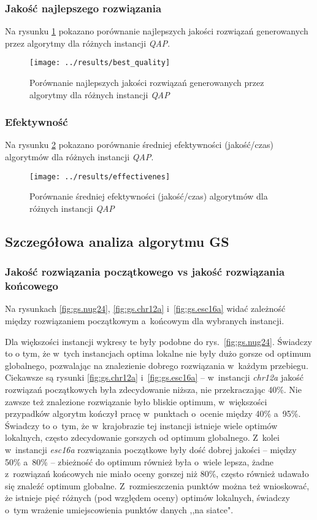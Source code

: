 \documentclass{article}
\begin{document}
		\subsubsection{Jakość najlepszego rozwiązania}Na rysunku \ref{fig:best_quality} pokazano porównanie najlepszych jakości rozwiązań generowanych przez algorytmy dla różnych instancji \emph{QAP}.
		 	\begin{figure}[h]
				\texttt{[image: ../results/best\_quality]}
				\caption{Porównanie najlepszych jakości rozwiązań generowanych przez algorytmy dla różnych instancji \emph{QAP}\label{fig:best_quality}}
			\end{figure}

		\subsubsection{Efektywność}Na rysunku \ref{fig:effectivenes} pokazano porównanie średniej efektywności (jakość/czas) algorytmów dla różnych instancji \emph{QAP}.
			\begin{figure}[h]
				\texttt{[image: ../results/effectivenes]}
				\caption{Porównanie średniej efektywności (jakość/czas) algorytmów dla różnych instancji \emph{QAP}\label{fig:effectivenes}}
			\end{figure}


	\subsection{Szczegółowa analiza algorytmu GS}

		\subsubsection{Jakość rozwiązania początkowego vs jakość rozwiązania końcowego}
			Na rysunkach \ref{fig:gs.nug24}, \ref{fig:gs.chr12a} i~\ref{fig:gs.esc16a} widać zależność między rozwiązaniem początkowym a~końcowym dla wybranych instancji.
			
			Dla większości instancji wykresy te były podobne do rys.~\ref{fig:gs.nug24}. Świadczy to o tym, że w~tych instancjach optima lokalne nie były dużo gorsze od optimum globalnego, pozwalając na znalezienie dobrego rozwiązania w~każdym przebiegu. Ciekawsze są rysunki \ref{fig:gs.chr12a} i~\ref{fig:gs.esc16a} -- w~instancji \emph{chr12a} jakość rozwiązań początkowych była zdecydowanie niższa, nie przekraczając 40\%. Nie zawsze też znalezione rozwiązanie było bliskie optimum, w~większości przypadków algorytm kończył pracę w~punktach o~ocenie między 40\% a~95\%. Świadczy to o~tym, że w~krajobrazie tej instancji istnieje wiele optimów lokalnych, często zdecydowanie gorszych od optimum globalnego. Z~kolei w~instancji \emph{esc16a} rozwiązania początkowe były dość dobrej jakości -- między 50\% a~80\% -- zbieżność do optimum również była o~wiele lepsza, żadne z~rozwiązań końcowych nie miało oceny gorszej niż 80\%, często również udawało się znaleźć optimum globalne. Z~rozmieszczenia punktów można też wnioskować, że istnieje pięć różnych (pod względem oceny) optimów lokalnych, świadczy o~tym wrażenie umiejscowienia punktów danych ,,na siatce".
			
\end{document}
